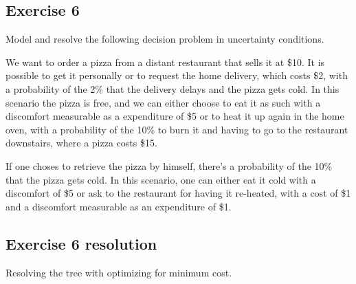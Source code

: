 \documentclass[\main/main.tex]{subfiles}
\begin{document}
\subsection{Exercise 6}
Model and resolve the following decision problem in uncertainty conditions.

We want to order a pizza from a distant restaurant that sells it at \$10. It is possible to get it personally or to request the home delivery, which costs \$2, with a probability of the 2\% that the delivery delays and the pizza gets cold. In this scenario the pizza is free, and we can either choose to eat it as such with a discomfort measurable as a expenditure of \$5 or to heat it up again in the home oven, with a probability of the 10\% to burn it and having to go to the restaurant downstairs, where a pizza costs \$15.

If one choses to retrieve the pizza by himself, there's a probability of the 10\% that the pizza gets cold. In this scenario, one can either eat it cold with a discomfort of \$5 or ask to the restaurant for having it re-heated, with a cost of \$1 and a discomfort measurable as an expenditure of \$1.

\subsection{Exercise 6 resolution}
\begin{figure}
\end{figure}

Resolving the tree with optimizing for minimum cost.

\begin{figure}
\end{figure}
\end{document}

